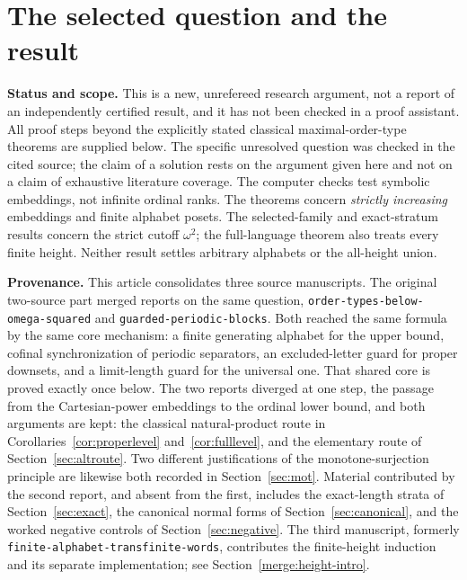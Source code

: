 \documentclass[11pt,a4paper]{article}
\numberwithin{equation}{section}
\theoremstyle{definition}
\theoremstyle{remark}
\begin{document}
\section{The selected question and the result}
\label{sec:intro}

\begin{resultbox}
\textbf{Status and scope.} This is a new, unrefereed research argument, not a
report of an independently certified result, and it has not been checked in a
proof assistant. All proof steps beyond the explicitly stated classical
maximal-order-type theorems are supplied below. The specific unresolved
question was checked in the cited source; the claim of a solution rests on the
argument given here and not on a claim of exhaustive literature coverage.
The computer checks test symbolic embeddings, not infinite ordinal ranks.
The theorems concern \emph{strictly increasing} embeddings and finite
alphabet posets. The selected-family and exact-stratum results concern
the strict cutoff $\omega^2$; the full-language theorem also treats every
finite height. Neither result settles arbitrary alphabets or the all-height union.

\medskip
\textbf{Provenance.} This article consolidates three source manuscripts.
The original two-source part merged reports on the same question, \texttt{order-types-below-omega-squared} and
\texttt{guarded-periodic-blocks}. Both reached the same formula by the same
core mechanism: a finite generating alphabet for the upper bound, cofinal
synchronization of periodic separators, an excluded-letter guard for proper
downsets, and a limit-length guard for the universal one. That shared core is
proved exactly once below. The two reports diverged at one step, the passage
from the Cartesian-power embeddings to the ordinal lower bound, and both
arguments are kept: the classical natural-product route in
Corollaries~\ref{cor:properlevel} and~\ref{cor:fulllevel}, and the elementary
route of Section~\ref{sec:altroute}. Two different justifications of the
monotone-surjection principle are likewise both recorded in
Section~\ref{sec:mot}. Material contributed by the second report, and absent
from the first, includes the exact-length strata of
Section~\ref{sec:exact}, the canonical normal forms of
Section~\ref{sec:canonical}, and the worked negative controls of
Section~\ref{sec:negative}. The third manuscript, formerly
\texttt{finite-alphabet-transfinite-words}, contributes the finite-height
induction and its separate implementation; see Section~\ref{merge:height-intro}.
\end{resultbox}
\end{document}
